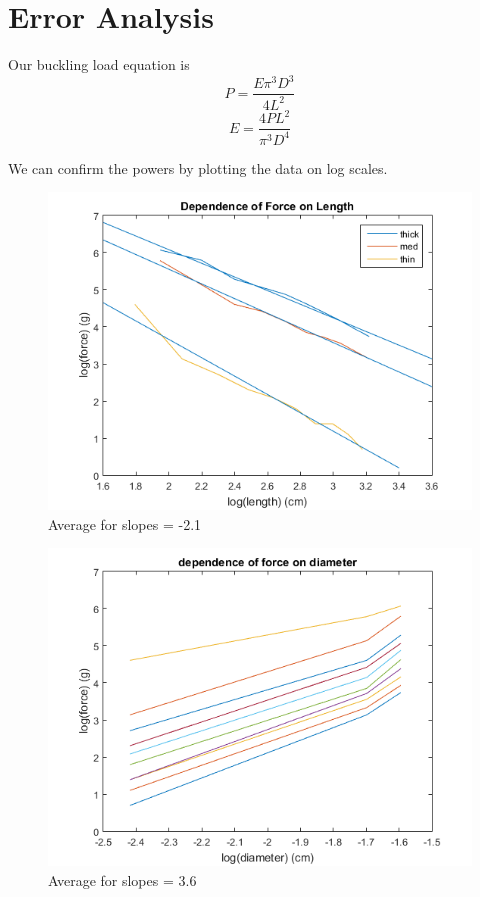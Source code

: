 \documentclass[12pt]{article}
\newcommand\tab[1][1.5cm]{\hspace*{#1}}
\begin{document}
\section{Error Analysis}

\tab Our buckling load equation is
$$P = \frac{E\pi ^3D^3}{4L^2}$$
$$E = \frac{4PL^2}{\pi ^3D^4}$$

\tab We can confirm the powers by plotting the data on log scales.

\begin{figure}[h]
	\centering
	\includegraphics[scale=0.8]{Lab1f1_2.png}
	\caption{Average for slopes = -2.1}
\end{figure}
\begin{figure}
	\centering
	\includegraphics[scale=0.8]{Lab1f2_2.png}
	\caption{Average for slopes = 3.6}
\end{figure}
\end{document}
